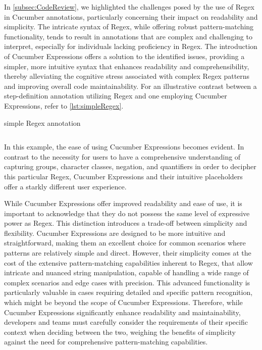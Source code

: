 In \cref{subsec:CodeReview}, we highlighted the challenges posed by the use of \ac{Regex} in Cucumber annotations, particularly concerning their impact on readability and simplicity. The intricate syntax of \ac{Regex}, while offering robust pattern-matching functionality, tends to result in annotations that are complex and challenging to interpret, especially for individuals lacking proficiency in \ac{Regex}. The introduction of Cucumber Expressions offers a solution to the identified issues, providing a simpler, more intuitive syntax that enhances readability and comprehensibility, thereby alleviating the cognitive stress associated with complex \ac{Regex} patterns and improving overall code maintainability. For an illustrative contrast between a step-definition annotation utilizing \ac{Regex} and one employing Cucumber Expressions, refer to \cref{lst:simpleRegex}.

\begin{listing}[!ht]
\caption{simple \ac{Regex} annotation}
\label{lst:simpleRegex}
\inputminted{java}{files/code/simpleRegex.java}
\end{listing}

In this example, the ease of using Cucumber Expressions becomes evident. In contrast to the necessity for users to have a comprehensive understanding of capturing groups, character classes, negation, and quantifiers in order to decipher this particular \ac{Regex}, Cucumber Expressions and their intuitive placeholders offer a starkly different user experience.

While Cucumber Expressions offer improved readability and ease of use, it is important to acknowledge that they do not possess the same level of expressive power as \ac{Regex}. This distinction introduces a trade-off between simplicity and flexibility. Cucumber Expressions are designed to be more intuitive and straightforward, making them an excellent choice for common scenarios where patterns are relatively simple and direct. However, their simplicity comes at the cost of the extensive pattern-matching capabilities inherent to \ac{Regex}, that allow intricate and nuanced string manipulation, capable of handling a wide range of complex scenarios and edge cases with precision. This advanced functionality is particularly valuable in cases requiring detailed and specific pattern recognition, which might be beyond the scope of Cucumber Expressions. Therefore, while Cucumber Expressions significantly enhance readability and maintainability, developers and teams must carefully consider the requirements of their specific context when deciding between the two, weighing the benefits of simplicity against the need for comprehensive pattern-matching capabilities.


